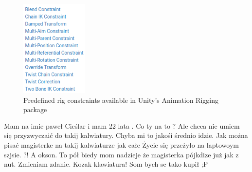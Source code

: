 \begin{figure}
    \centering
    \includegraphics[width=0.3\textwidth]{grafika/ar_constraints.png}
    \caption{Predefined rig constraints available in Unity's Animation Rigging
    package \cite{ar_constraints}}
    \label{fig:ar_constraints}
\end{figure}

Mam na imie paweł Cieślar i mam 22 lata . Co ty na to ? Ale checa nie umiem się
przyzwyczaić do takij kalwiatury. Chyba mi to jakośi średnio idzie. Jak można
pisać magisterke na takij kalwiaturze jak całe Życie się przeżyło na laptowoym
szjsie. ?! A okson. To pół biedy mom nadzieje że magisterka pójkdize już jak
z nut. Zmieniam zdanie. Kozak klawiatura! Som bych se tako kupił ;P 

